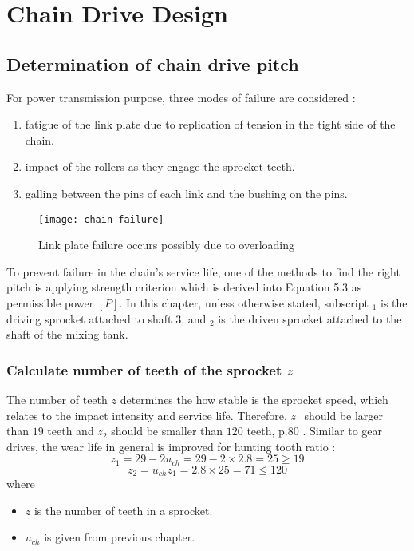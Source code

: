 \chapter{Chain Drive Design}

\section{Determination of chain drive pitch}
For power transmission purpose, three modes of failure are considered \cite{mott_vavrek_wang_2018}:
\begin{enumerate}
	\item fatigue of the link plate due to replication of tension in the tight side of the chain.
	\item impact of the rollers as they engage the sprocket teeth.
	\item galling between the pins of each link and the bushing on the pins.
\end{enumerate}
\begin{figure}[ht]
	\centering
	\texttt{[image: chain failure]}
	\caption{Link plate failure occurs possibly due to overloading}
	\label{fig:chain failure}
\end{figure}


To prevent failure in the chain's service life, one of the methods to find the right pitch is applying strength criterion which is derived into Equation 5.3 \cite{tk1} as permissible power $ [P] $. In this chapter, unless otherwise stated, subscript $ _1 $ is the driving sprocket attached to shaft 3, and $ _2 $ is the driven sprocket attached to the shaft of the mixing tank.

\subsection{Calculate number of teeth of the sprocket $ z $}
The number of teeth $ z $ determines the how stable is the sprocket speed, which relates to the impact intensity and service life. Therefore, $ z_1 $ should be larger than $ 19 $ teeth and $ z_2 $ should be smaller than $ 120 $ teeth, p.80 \cite{tk1}. Similar to gear drives, the wear life in general is improved for hunting tooth ratio \cite{ibt_industrial_solutions}:\\
\[ z_1 = 29 - 2u_{ch} = 29 - 2 \times 2.8 = 25 \geq 19\]
\[ z_2 = u_{ch}z_1 = 2.8 \times 25 = 71 \leq 120\]
where
\begin{itemize}
	\item $ z $ is the number of teeth in a sprocket.
	\item $ u_{ch} $ is given from previous chapter.
\end{itemize}

